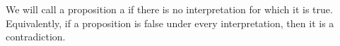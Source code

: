 \begin{node}[Definition]\label{prop-0008}%
We will call a proposition a  if there is no
interpretation for which it is true. Equivalently, if a proposition is
false under every interpretation, then it is a contradiction.
\end{node}
